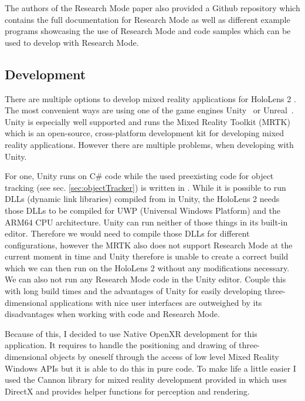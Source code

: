 The authors of the Research Mode paper also provided a Github repository \cite{GithubRepoHololens2ForCV} which contains the full documentation for Research Mode as well as different example programs showcasing the use of Research Mode and code samples which can be used to develop with Research Mode.

\subsection{Development}

There are multiple options to develop mixed reality applications for HoloLens 2 \cite{DevMixedReality}. The most convenient ways are using one of the game engines Unity~\cite{Unity} or Unreal~\cite{Unreal}. Unity is especially well supported and runs the Mixed Reality Toolkit (MRTK) \cite{UnityMRTK} which is an open-source, cross-platform development kit for developing mixed reality applications. However there are multiple problems, when developing with Unity.

For one, Unity runs on C\# code while the used preexisting code for object tracking (see sec. \ref{sec:objectTracker}) is written in \Cpp. While it is possible to run DLLs (dynamic link libraries) compiled from \Cpp in Unity, the HoloLens 2 needs those DLLs to be compiled for UWP (Universal Windows Platform) and the ARM64 CPU architecture. Unity can run neither of those things in its built-in editor. Therefore we would need to compile those DLLs for different configurations, however the MRTK also does not support Research Mode at the current moment in time and Unity therefore is unable to create a correct build which we can then run on the HoloLens 2 without any modifications necessary. We can also not run any Research Mode code in the Unity editor. Couple this with long build times and the advantages of Unity for easily developing three-dimensional applications with nice user interfaces are outweighed by its disadvantages when working with \Cpp code and Research Mode.

Because of this, I decided to use Native OpenXR development for this application. It requires to handle the positioning and drawing of three-dimensional objects by oneself through the access of low level Mixed Reality Windows APIs but it is able to do this in pure \Cpp code. To make life a little easier I used the Cannon library for mixed reality development provided in \cite{GithubRepoHololens2ForCV} which uses DirectX and provides helper functions for perception and rendering.


